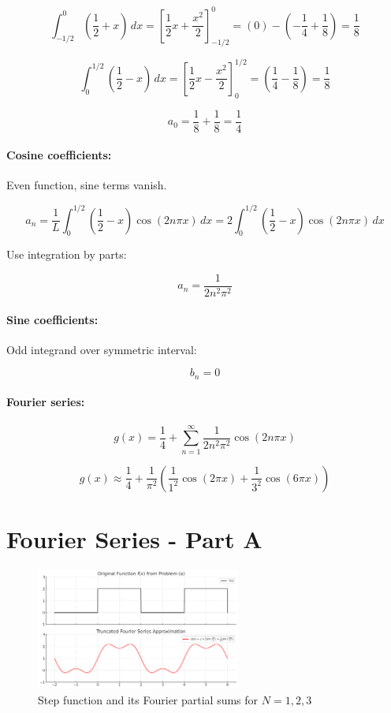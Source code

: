 \documentclass{article}
\begin{document}
\[
\int_{-1/2}^{0} \left( \frac{1}{2} + x \right)\,dx =
\left[ \frac{1}{2}x + \frac{x^2}{2} \right]_{-1/2}^0
= \left( 0 \right) - \left( -\frac{1}{4} + \frac{1}{8} \right) = \frac{1}{8}
\]

\[
\int_0^{1/2} \left( \frac{1}{2} - x \right)\,dx =
\left[ \frac{1}{2}x - \frac{x^2}{2} \right]_0^{1/2}
= \left( \frac{1}{4} - \frac{1}{8} \right) = \frac{1}{8}
\]

\[
a_0 = \frac{1}{8} + \frac{1}{8} = \frac{1}{4}
\]

\paragraph{Cosine coefficients:}

Even function, sine terms vanish.

\[
a_n = \frac{1}{L} \int_0^{1/2} \left( \frac{1}{2} - x \right) \cos(2n\pi x)\,dx
= 2 \int_0^{1/2} \left( \frac{1}{2} - x \right) \cos(2n\pi x)\,dx
\]

Use integration by parts:

\[
a_n = \frac{1}{2n^2\pi^2}
\]

\paragraph{Sine coefficients:}

Odd integrand over symmetric interval:

\[
b_n = 0
\]

\paragraph{Fourier series:}

\[
g(x) = \frac{1}{4} + \sum_{n=1}^\infty \frac{1}{2n^2\pi^2} \cos(2n\pi x)
\]

\[
g(x) \approx \frac{1}{4} + \frac{1}{\pi^2} \left( \frac{1}{1^2} \cos(2\pi x) + \frac{1}{3^2} \cos(6\pi x) \right)
\]

\section*{Fourier Series - Part A}

\begin{figure}[h!]
    \centering
    \includegraphics[width=0.6\textwidth]{Figure_1.png}
    \caption{Step function and its Fourier partial sums for $N=1,2,3$}
\end{figure}
\end{document}
